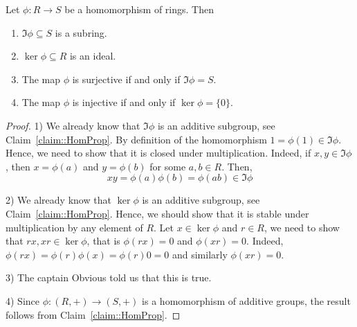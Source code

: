 \begin{claim}
\label{claim::RingHomProp}
Let $\phi\colon R\to S$ be a homomorphism of rings.
Then
\begin{enumerate}
\item $\Im\phi\subseteq S$ is a subring.

\item $\ker \phi\subseteq R$ is an ideal.

\item The map $\phi$ is surjective if and only if $\Im\phi = S$.

\item The map $\phi$ is injective if and only if $\ker \phi = \{0\}$.
\end{enumerate}
\end{claim}
\begin{proof}
1) We already know that $\Im \phi$ is an additive subgroup, see Claim~\ref{claim::HomProp}.
By definition of the homomorphism $1 = \phi(1) \in \Im \phi$.
Hence, we need to show that it is closed under multiplication.
Indeed, if $x,y\in \Im\phi$, then $x = \phi(a)$ and $y = \phi(b)$ for some $a,b\in R$.
Then,
\[
xy = \phi(a) \phi(b) = \phi(ab) \in \Im \phi
\]

2) We already know that $\ker \phi$ is an additive subgroup, see Claim~\ref{claim::HomProp}.
Hence, we should show that it is stable under multiplication by any element of $R$.
Let $x\in \ker \phi$ and $r\in R$, we need to show that $rx, xr \in \ker \phi$, that is $\phi(rx) = 0$ and $\phi(xr) = 0$.
Indeed, $\phi(rx) = \phi(r)\phi(x) = \phi(r) 0 = 0$ and similarly $\phi(xr) = 0$.

3) The captain Obvious told us that this is true.

4) Since $\phi\colon (R,+)\to (S,+)$ is a homomorphism of additive groups, the result follows from Claim~\ref{claim::HomProp}.

\end{proof}

